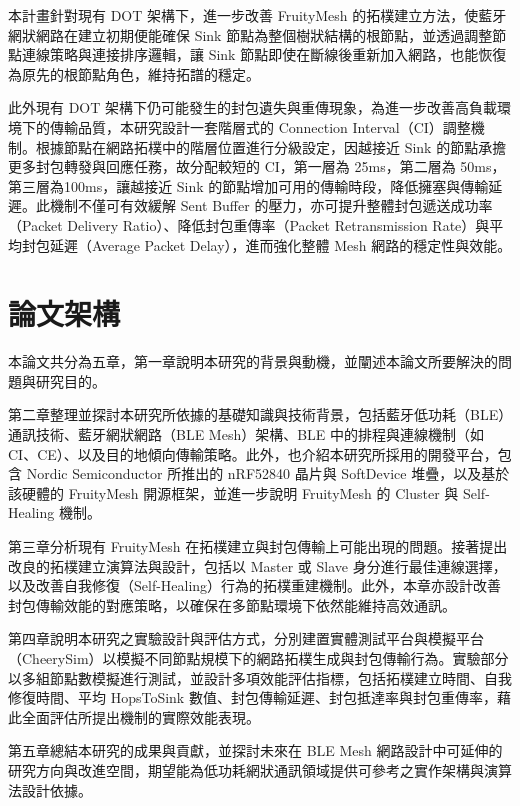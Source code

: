 \begin{ZhChapter}
本計畫針對現有 DOT 架構下，進一步改善 FruityMesh 的拓樸建立方法，使藍牙網狀網路在建立初期便能確保 Sink 節點為整個樹狀結構的根節點，並透過調整節點連線策略與連接排序邏輯，讓 Sink 節點即使在斷線後重新加入網路，也能恢復為原先的根節點角色，維持拓譜的穩定。

此外現有 DOT 架構下仍可能發生的封包遺失與重傳現象，為進一步改善高負載環境下的傳輸品質，本研究設計一套階層式的 Connection Interval（CI）調整機制。根據節點在網路拓樸中的階層位置進行分級設定，因越接近 Sink 的節點承擔更多封包轉發與回應任務，故分配較短的 CI，第一層為 25ms，第二層為 50ms，第三層為100ms，讓越接近 Sink 的節點增加可用的傳輸時段，降低擁塞與傳輸延遲。此機制不僅可有效緩解 Sent Buffer 的壓力，亦可提升整體封包遞送成功率（Packet Delivery Ratio）、降低封包重傳率（Packet Retransmission Rate）與平均封包延遲（Average Packet Delay），進而強化整體 Mesh 網路的穩定性與效能。

\section{論文架構}
本論文共分為五章，第一章說明本研究的背景與動機，並闡述本論文所要解決的問題與研究目的。

第二章整理並探討本研究所依據的基礎知識與技術背景，包括藍牙低功耗（BLE）通訊技術、藍牙網狀網路（BLE Mesh）架構、BLE 中的排程與連線機制（如 CI、CE）、以及目的地傾向傳輸策略。此外，也介紹本研究所採用的開發平台，包含 Nordic Semiconductor 所推出的 nRF52840 晶片與 SoftDevice 堆疊，以及基於該硬體的 FruityMesh 開源框架，並進一步說明 FruityMesh 的 Cluster 與 Self-Healing 機制。

第三章分析現有 FruityMesh 在拓樸建立與封包傳輸上可能出現的問題。接著提出改良的拓樸建立演算法與設計，包括以 Master 或 Slave 身分進行最佳連線選擇，以及改善自我修復（Self-Healing）行為的拓樸重建機制。此外，本章亦設計改善封包傳輸效能的對應策略，以確保在多節點環境下依然能維持高效通訊。

第四章說明本研究之實驗設計與評估方式，分別建置實體測試平台與模擬平台（CheerySim）以模擬不同節點規模下的網路拓樸生成與封包傳輸行為。實驗部分以多組節點數模擬進行測試，並設計多項效能評估指標，包括拓樸建立時間、自我修復時間、平均 HopsToSink 數值、封包傳輸延遲、封包抵達率與封包重傳率，藉此全面評估所提出機制的實際效能表現。

第五章總結本研究的成果與貢獻，並探討未來在 BLE Mesh 網路設計中可延伸的研究方向與改進空間，期望能為低功耗網狀通訊領域提供可參考之實作架構與演算法設計依據。


\end{ZhChapter}